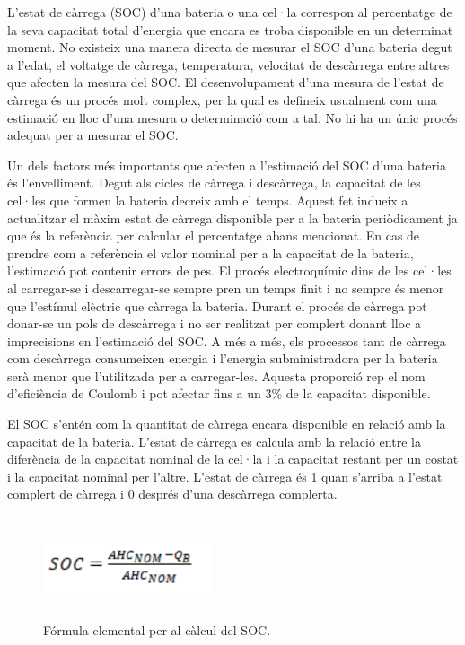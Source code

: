 L'estat de càrrega (SOC) d'una bateria o una cel·la correspon al percentatge de la seva capacitat total d'energia que encara es troba disponible en un determinat moment. No existeix una manera directa de mesurar el SOC d'una bateria degut a l'edat, el voltatge de càrrega, temperatura, velocitat de descàrrega entre altres que afecten la mesura del SOC. El desenvolupament d'una mesura de l'estat de càrrega és un procés molt complex, per la qual es defineix usualment com una estimació en lloc d'una mesura o determinació com a tal. No hi ha un únic procés adequat per a mesurar el SOC.

Un dels factors més importants que afecten a l'estimació del SOC d'una bateria és l'envelliment. Degut als cicles de càrrega i descàrrega, la capacitat de les cel·les que formen la bateria decreix amb el temps. Aquest fet indueix a actualitzar el màxim estat de càrrega disponible per a la bateria periòdicament ja que és la referència per calcular el percentatge abans mencionat. En cas de prendre com a referència el valor nominal per a la capacitat de la bateria, l'estimació pot contenir errors de pes. El procés electroquímic dins de les cel·les al carregar-se i descarregar-se sempre pren un temps finit i no sempre és menor que l'estímul elèctric que càrrega la bateria. Durant el procés de càrrega pot donar-se un pols de descàrrega i no ser realitzat per complert donant lloc a imprecisions en l'estimació del SOC. A més a més, els processos tant de càrrega com descàrrega consumeixen energia i l'energia subministradora per la bateria serà menor que l'utilitzada per a carregar-les. Aquesta proporció rep el nom d'eficiència de Coulomb i pot afectar fins a un 3\% de la capacitat disponible. 

El SOC s'entén com la quantitat de càrrega encara disponible en relació amb la capacitat de la bateria. L'estat de càrrega es calcula amb la relació entre la diferència de la capacitat nominal de la cel·la i la capacitat restant per un costat i la capacitat nominal per l'altre. L'estat de càrrega és 1 quan s'arriba a l'estat complert de càrrega i 0 després d'una descàrrega complerta.

\begin{figure}[H]
	\centering
    \includegraphics[width=5cm, height=3cm] {BMS/Coulombcountingformula.png}
    \caption{Fórmula elemental per al càlcul del SOC.}
\end{figure}

